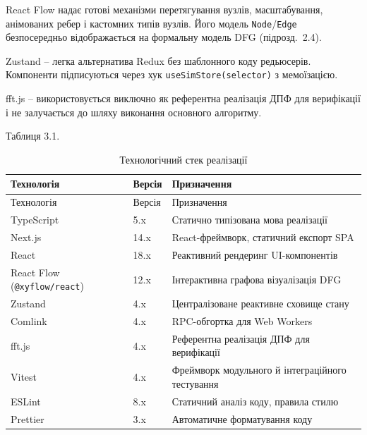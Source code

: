 \documentclass[
]{article}
\begin{document}
React Flow надає готові механізми перетягування вузлів, масштабування,
анімованих ребер і кастомних типів вузлів. Його модель
\texttt{Node}/\texttt{Edge} безпосередньо відображається на формальну
модель DFG (підрозд.~2.4).

Zustand -- легка альтернатива Redux без шаблонного коду редьюсерів.
Компоненти підписуються через хук
\texttt{useSimStore}\texttt{(}\texttt{selector}\texttt{)} з мемоїзацією.

fft.js -- використовується виключно як референтна реалізація ДПФ для
верифікації і не залучається до шляху виконання основного алгоритму.

Таблиця 3.1.

\begin{longtable}[]{@{}
  >{\raggedright\arraybackslash}p{}
  >{\raggedright\arraybackslash}p{}
  >{\raggedright\arraybackslash}p{}@{}}
\caption{Технологічний стек реалізації}\tabularnewline
\toprule\noalign{}
\begin{minipage}[b]{\linewidth}\raggedright
Технологія
\end{minipage} & \begin{minipage}[b]{\linewidth}\raggedright
Версія
\end{minipage} & \begin{minipage}[b]{\linewidth}\raggedright
Призначення
\end{minipage} \\
\midrule\noalign{}
\endfirsthead
\toprule\noalign{}
\begin{minipage}[b]{\linewidth}\raggedright
Технологія
\end{minipage} & \begin{minipage}[b]{\linewidth}\raggedright
Версія
\end{minipage} & \begin{minipage}[b]{\linewidth}\raggedright
Призначення
\end{minipage} \\
\midrule\noalign{}
\endhead
\bottomrule\noalign{}
\endlastfoot
TypeScript & 5.x & Статично типізована мова реалізації \\
Next.js & 14.x & React-фреймворк, статичний експорт SPA \\
React & 18.x & Реактивний рендеринг UI-компонентів \\
React Flow (\texttt{@xyflow/react}) & 12.x & Інтерактивна графова
візуалізація DFG \\
Zustand & 4.x & Централізоване реактивне сховище стану \\
Comlink & 4.x & RPC-обгортка для Web Workers \\
fft.js & 4.x & Референтна реалізація ДПФ для верифікації \\
Vitest & 4.x & Фреймворк модульного й інтеграційного тестування \\
ESLint & 8.x & Статичний аналіз коду, правила стилю \\
Prettier & 3.x & Автоматичне форматування коду \\
\end{longtable}
\end{document}
